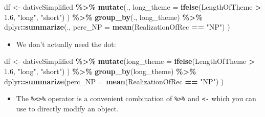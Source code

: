 \documentclass[
]{book}
\newenvironment{Shaded}{\begin{snugshade}}{\end{snugshade}}
\newcommand{\AttributeTok}[1]{\textcolor[rgb]{0.13,0.29,0.53}{#1}}
\newcommand{\FloatTok}[1]{\textcolor[rgb]{0.00,0.00,0.81}{#1}}
\newcommand{\FunctionTok}[1]{\textcolor[rgb]{0.13,0.29,0.53}{\textbf{#1}}}
\newcommand{\NormalTok}[1]{#1}
\newcommand{\OtherTok}[1]{\textcolor[rgb]{0.56,0.35,0.01}{#1}}
\newcommand{\SpecialCharTok}[1]{\textcolor[rgb]{0.81,0.36,0.00}{\textbf{#1}}}
\newcommand{\StringTok}[1]{\textcolor[rgb]{0.31,0.60,0.02}{#1}}
\providecommand{\tightlist}{%
  \setlength{\itemsep}{0pt}\setlength{\parskip}{0pt}}
\begin{document}
\begin{Shaded}
\begin{Highlighting}[]
\NormalTok{df }\OtherTok{\textless{}{-}}\NormalTok{  dativeSimplified }\SpecialCharTok{\%\textgreater{}\%}
          \FunctionTok{mutate}\NormalTok{(., }\AttributeTok{long\_theme =} \FunctionTok{ifelse}\NormalTok{(LengthOfTheme }\SpecialCharTok{\textgreater{}} \FloatTok{1.6}\NormalTok{, }\StringTok{"long"}\NormalTok{, }\StringTok{"short"}\NormalTok{) ) }\SpecialCharTok{\%\textgreater{}\%} 
          \FunctionTok{group\_by}\NormalTok{(., long\_theme) }\SpecialCharTok{\%\textgreater{}\%} 
\NormalTok{          dplyr}\SpecialCharTok{::}\FunctionTok{summarize}\NormalTok{(., }\AttributeTok{perc\_NP =} \FunctionTok{mean}\NormalTok{(RealizationOfRec }\SpecialCharTok{==} \StringTok{"NP"}\NormalTok{) )}
\end{Highlighting}
\end{Shaded}

\begin{itemize}
\tightlist
\item
  We don't actually need the dot:
\end{itemize}

\begin{Shaded}
\begin{Highlighting}[]
\NormalTok{df }\OtherTok{\textless{}{-}}\NormalTok{  dativeSimplified }\SpecialCharTok{\%\textgreater{}\%}
          \FunctionTok{mutate}\NormalTok{(}\AttributeTok{long\_theme =} \FunctionTok{ifelse}\NormalTok{(LengthOfTheme }\SpecialCharTok{\textgreater{}} \FloatTok{1.6}\NormalTok{, }\StringTok{"long"}\NormalTok{, }\StringTok{"short"}\NormalTok{) ) }\SpecialCharTok{\%\textgreater{}\%} 
          \FunctionTok{group\_by}\NormalTok{(long\_theme) }\SpecialCharTok{\%\textgreater{}\%} 
\NormalTok{          dplyr}\SpecialCharTok{::}\FunctionTok{summarize}\NormalTok{(}\AttributeTok{perc\_NP =} \FunctionTok{mean}\NormalTok{(RealizationOfRec }\SpecialCharTok{==} \StringTok{"NP"}\NormalTok{) )}
\end{Highlighting}
\end{Shaded}

\begin{itemize}
\tightlist
\item
  The \texttt{\%\textless{}\textgreater{}\%} operator is a convenient combination of \texttt{\%\textgreater{}\%} and \texttt{\textless{}-} which you can use to directly modify an object.
\end{itemize}
\end{document}
